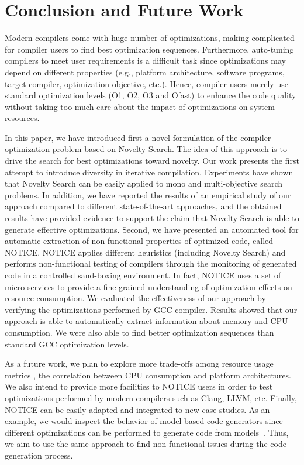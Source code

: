 \section{Conclusion and Future Work}
Modern compilers come with huge number of optimizations, making complicated for compiler users to find best optimization sequences. Furthermore, auto-tuning compilers to meet user requirements is a difficult task since optimizations may depend on different properties (e.g., platform architecture, software programs, target compiler, optimization objective, etc.).
Hence, compiler users merely use standard optimization levels (O1, O2, O3 and Ofast) to enhance the code quality without taking too much care about the impact of optimizations on system resources.

In this paper, we have introduced first a novel formulation of the compiler optimization problem based on Novelty Search. The idea of this approach is to drive the search for best optimizations toward novelty. Our work presents the first attempt to introduce diversity in iterative compilation. Experiments have shown that Novelty Search can be easily applied to mono and multi-objective search problems. In addition, we have reported the results of an empirical study of our approach compared to different state-of-the-art approaches, and the obtained results have provided evidence to support the claim that Novelty Search is able to generate effective optimizations.
Second, we have presented an automated tool for automatic extraction of non-functional properties of optimized code, called NOTICE. NOTICE applies different heuristics (including Novelty Search) and performs non-functional testing of compilers through the monitoring of generated code in a controlled sand-boxing environment. In fact, NOTICE uses a set of micro-services to provide a fine-grained understanding of optimization effects on resource consumption. 
We evaluated the effectiveness of our approach by verifying the optimizations performed by GCC compiler. 
Results showed that our approach is able to automatically extract information about memory and CPU consumption. We were also able to find better optimization sequences than standard GCC optimization levels.

As a future work, we plan to explore more trade-offs among resource usage metrics \eg, the correlation between CPU consumption and platform architectures. 
We also intend to provide more facilities to NOTICE users in order to test optimizations performed by modern compilers such as Clang, LLVM, etc.
Finally, NOTICE can be easily adapted and integrated to new case studies. As an example, we would inspect the behavior of model-based code generators since different optimizations can be performed to generate code from models~\cite{stuermer2007systematic}. Thus, we aim to use the same approach to find non-functional issues during the code generation process.



